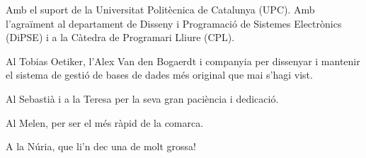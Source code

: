 Amb el suport de la Universitat Politècnica de Catalunya (UPC). Amb l'agraïment al departament de Disseny i Programació de Sistemes Electrònics (DiPSE) i a la Càtedra de Programari Lliure (CPL).

Al Tobias Oetiker, l'Alex Van den Bogaerdt i companyia per dissenyar i mantenir el sistema de gestió de bases de dades més original que mai s'hagi vist.

Al Sebastià i a la Teresa per la seva gran paciència i dedicació. 

Al Melen, per ser el més ràpid de la comarca.

A la Núria, que li'n dec una de molt grossa!







